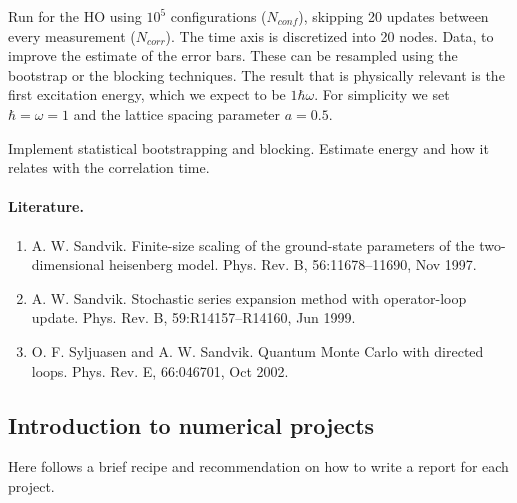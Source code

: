 \documentclass[%
oneside,                 %
final,                   %
10pt]{article}
\begin{document}
\noindent
Run for the HO using $10^5$ configurations ($N_{conf}$), skipping 20 updates between every measurement ($N_{corr}$). The time axis is discretized into 20 nodes. Data, to improve the estimate of the error bars. These can be  resampled using the bootstrap or the blocking techniques. 
The result that is physically relevant is the first excitation energy, which we expect to be $1\hbar\omega$. For simplicity we set $\hbar=\omega=1$ and the lattice spacing parameter $a = 0.5$.

Implement statistical bootstrapping and blocking. 
Estimate energy and how it relates  with the correlation time.

\paragraph{Literature.}
\begin{enumerate}
\item A. W. Sandvik. Finite-size scaling of the ground-state parameters of the two-dimensional heisenberg model. Phys. Rev. B, 56:11678–11690, Nov 1997.

\item A. W. Sandvik. Stochastic series expansion method with operator-loop update. Phys. Rev. B, 59:R14157–R14160, Jun 1999.

\item O. F. Syljuasen and A. W. Sandvik. Quantum Monte Carlo with directed loops. Phys. Rev. E, 66:046701, Oct 2002.~
\end{enumerate}

\noindent
\subsection{Introduction to numerical projects}

Here follows a brief recipe and recommendation on how to write a report for each
project.
\end{document}
